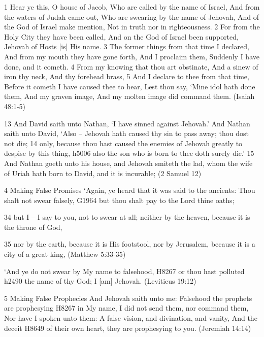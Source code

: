 \documentclass[11pt]{article}
\begin{document}
1 Hear ye this, O house of Jacob, Who are called by the name of Israel, And from the waters of Judah came out, Who are swearing by the name of Jehovah, And of the God of Israel make mention, Not in truth nor in righteousness.
2 For from the Holy City they have been called, And on the God of Israel been supported, Jehovah of Hosts [is] His name.
3 The former things from that time I declared, And from my mouth they have gone forth, And I proclaim them, Suddenly I have done, and it cometh.
4 From my knowing that thou art obstinate, And a sinew of iron thy neck, And thy forehead brass,
5 And I declare to thee from that time, Before it cometh I have caused thee to hear, Lest thou say, `Mine idol hath done them, And my graven image, And my molten image did command them.
(Isaiah 48:1-5)\newline

13 And David saith unto Nathan, `I have sinned against Jehovah.' And Nathan saith unto David, `Also -- Jehovah hath caused thy sin to pass away; thou dost not die;
14 only, because thou hast caused the enemies of Jehovah greatly to despise by this thing, h5006 also the son who is born to thee doth surely die.'
15 And Nathan goeth unto his house, and Jehovah smiteth the lad, whom the wife of Uriah hath born to David, and it is incurable;
(2 Samuel 12)\newline

{\Large 4 Making False Promises} `Again, ye heard that it was said to the ancients: Thou shalt not swear falsely, G1964 but thou shalt pay to the Lord thine oaths;

34 but I -- I say to you, not to swear at all; neither by the heaven, because it is the throne of God,

35 nor by the earth, because it is His footstool, nor by Jerusalem, because it is a city of a great king,
(Matthew 5:33-35)\newline

 `And ye do not swear by My name to falsehood, H8267 or thou hast polluted  h2490 the name of thy God; I [am] Jehovah.
(Leviticus 19:12)\newline

{\Large 5 Making False Prophecies} And Jehovah saith unto me: Falsehood the prophets are prophesying H8267 in My name, I did not send them, nor command them, Nor have I spoken unto them: A false vision, and divination, and vanity, And the deceit H8649 of their own heart, they are prophesying to you.
(Jeremiah 14:14)\newline
\end{document}
